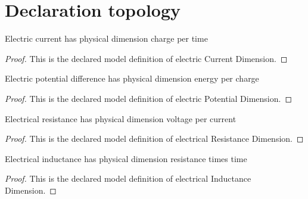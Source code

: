 \section{Declaration topology}
\begin{definition}
  \label{def:physics:phyx-mini-0984:phyxminiproblems-problemphyxmini0984-electriccurrentdimension}
  Electric current has physical dimension charge per time
\end{definition}
\begin{proof}
  This is the declared model definition of electric Current Dimension.
\end{proof}
\begin{definition}
  \label{def:physics:phyx-mini-0984:phyxminiproblems-problemphyxmini0984-electricpotentialdimension}
  Electric potential difference has physical dimension energy per charge
\end{definition}
\begin{proof}
  This is the declared model definition of electric Potential Dimension.
\end{proof}
\begin{definition}
  \label{def:physics:phyx-mini-0984:phyxminiproblems-problemphyxmini0984-electricalresistancedimension}
  Electrical resistance has physical dimension voltage per current
\end{definition}
\begin{proof}
  This is the declared model definition of electrical Resistance Dimension.
\end{proof}
\begin{definition}
  \label{def:physics:phyx-mini-0984:phyxminiproblems-problemphyxmini0984-electricalinductancedimension}
  Electrical inductance has physical dimension resistance times time
\end{definition}
\begin{proof}
  This is the declared model definition of electrical Inductance Dimension.
\end{proof}
